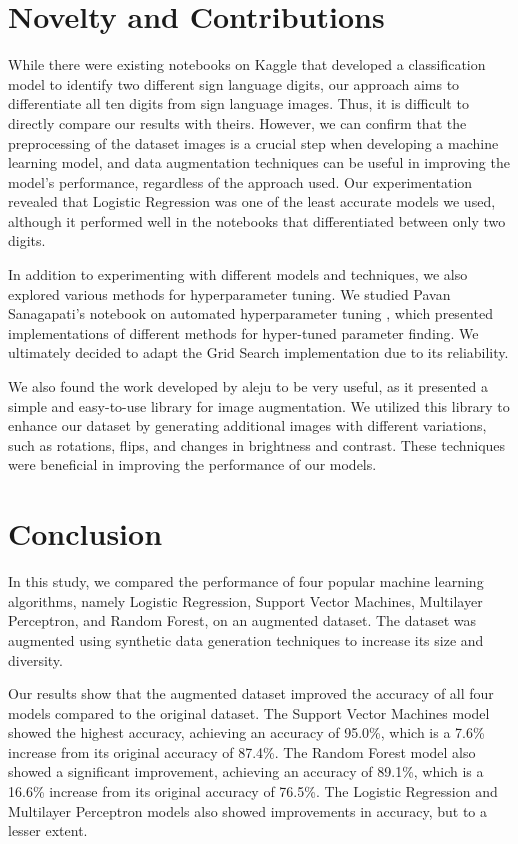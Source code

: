 \documentclass[conference]{IEEEtran}
\begin{document}
\section{Novelty and Contributions}
While there were existing notebooks on Kaggle that developed a classification model to identify two different sign language digits, our approach aims to differentiate all ten digits from sign language images. Thus, it is difficult to directly compare our results with theirs. However, we can confirm that the preprocessing of the dataset images is a crucial step when developing a machine learning model, and data augmentation techniques can be useful in improving the model's performance, regardless of the approach used. Our experimentation revealed that Logistic Regression was one of the least accurate models we used, although it performed well in the notebooks that differentiated between only two digits.

In addition to experimenting with different models and techniques, we also explored various methods for hyperparameter tuning. We studied Pavan Sanagapati's notebook on automated hyperparameter tuning \cite{hypertuning}, which presented implementations of different methods for hyper-tuned parameter finding. We ultimately decided to adapt the Grid Search implementation due to its reliability.

We also found the work developed by aleju \cite{imgaug} to be very useful, as it presented a simple and easy-to-use library for image augmentation. We utilized this library to enhance our dataset by generating additional images with different variations, such as rotations, flips, and changes in brightness and contrast. These techniques were beneficial in improving the performance of our models.
\section{Conclusion}

In this study, we compared the performance of four popular machine learning algorithms, namely Logistic Regression, Support Vector Machines, Multilayer Perceptron, and Random Forest, on an augmented dataset. The dataset was augmented using synthetic data generation techniques to increase its size and diversity.

Our results show that the augmented dataset improved the accuracy of all four models compared to the original dataset. The Support Vector Machines model showed the highest accuracy, achieving an accuracy of 95.0\%, which is a 7.6\% increase from its original accuracy of 87.4\%. The Random Forest model also showed a significant improvement, achieving an accuracy of 89.1\%, which is a 16.6\% increase from its original accuracy of 76.5\%. The Logistic Regression and Multilayer Perceptron models also showed improvements in accuracy, but to a lesser extent.
\end{document}
